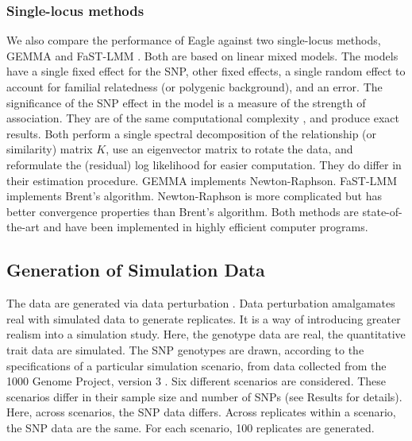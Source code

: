 \documentclass{bioinfo}
\begin{document}
\subsubsection{Single-locus methods} 
We also compare the performance of Eagle against two single-locus methods, GEMMA \citep{zhou2012genome} and FaST-LMM \citep{lippert2011fast}. Both are based on linear mixed models. The models have a single fixed effect for the SNP,  other fixed effects, 
a single random effect to account for familial relatedness (or polygenic background), and an error. The significance of the SNP effect in the model 
is a measure of the strength of association.  They are of the same computational complexity \citep{zhou2012genome}, and produce exact results.  
Both perform a single spectral decomposition of the relationship (or similarity) matrix $K$, use  an eigenvector matrix to rotate the data, 
and reformulate the (residual) log likelihood for easier computation. They do differ in their estimation procedure. GEMMA implements Newton-Raphson. 
FaST-LMM implements Brent's algorithm. Newton-Raphson is more complicated but has better convergence properties than Brent's algorithm. 
Both methods are state-of-the-art and have been implemented in highly efficient computer programs. 



\subsection{Generation of Simulation Data}
\label{subsection:simdata}

The data are generated via data perturbation \citep{zhao2007arabidopsis}. 
Data perturbation amalgamates real with simulated data to generate replicates. 
It is a way of introducing greater realism into a simulation study. 
 Here, the genotype data are real, the 
quantitative trait data are simulated. 
 The SNP genotypes are drawn, 
according to the specifications of a particular simulation scenario, from data collected from the 1000 Genome Project, version 3   \citep{10002010map}. Six different scenarios are considered. These scenarios differ in  their sample size and number of 
SNPs (see Results for details).  Here, across scenarios, the SNP data differs. Across replicates within a scenario, the SNP data are the same. For each scenario, 100 replicates are generated. 
\end{document}
